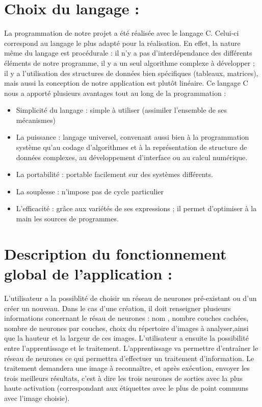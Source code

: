 \documentclass{article}
\begin{document}
\section{Choix du langage :}
La programmation de notre projet a été réalisée avec le langage C. Celui-ci correspond au langage le plus adapté pour la réalisation. En effet, la nature même du langage est procédurale : il n'y a pas d'interdépendance des différents éléments de notre programme, il y a un seul algorithme complexe à développer ; il y a l'utilisation des structures de données bien spécifiques (tableaux, matrices), mais aussi la conception de notre application est plutôt linéaire. 
Ce langage C nous a apporté plusieurs avantages tout au long de la programmation :
\begin{itemize}
\item Simplicité du langage : simple à utiliser (assimiler l'ensemble de ses mécanismes)
\item La puissance : langage universel, convenant aussi bien  à la programmation système qu'au codage d'algorithmes et à la représentation de structure de données complexes, au développement d'interface ou au calcul numérique.
\item La portabilité : portable facilement sur des systèmes différents.
\item La souplesse : n'impose pas de cycle particulier
\item L'efficacité : grâce aux variétés de ses expressions ; il permet d'optimiser à la main les sources de programmes.
\end{itemize}

\section{Description du fonctionnement global de l'application :}
L'utilisateur a la possiblité de choisir un réseau de neurones pré-existant ou d'un créer un nouveau. Dans le cas d'une création, il doit renseigner plusieurs informations concernant le résau de neurones : nom , nombre couches cachées, nombre de neurones par couches, choix du répertoire d'images à analyser,ainsi que la hauteur et la largeur de ces images. L'utilisateur a ensuite la possibilité entre l'apprentissage et le traitement.
L'apprentissage va permettre d'entraîner le réseau de neurones ce qui permettra d'effectuer un traitement d'information.
Le traitement demandera une image à reconnaître, et après exécution, envoyer les trois meilleurs résultats, c'est à dire les trois neurones de sorties avec la plus haute activation (correspondant aux étiquettes avec le plus de point communs avec l'image choisie). 
\end{document}
